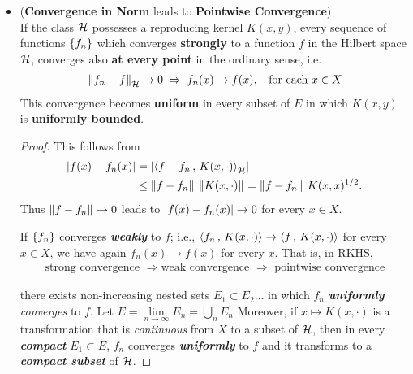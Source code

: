\documentclass[11pt]{article}
\begin{document}
\begin{itemize}
\item \begin{proposition} (\textbf{Convergence in Norm} leads to \textbf{Pointwise Convergence})\\
If the class ${\mathcal H}$ possesses a reproducing kernel $K(x, y)$, every sequence of functions $\left\{f_{n}\right\}$ which converges \textbf{strongly} to a function $f$ in the Hilbert space ${\mathcal H}$, converges also \textbf{at every point} in the ordinary sense, i.e. 
\begin{align*}
\left\|f_n - f\right\|_{{\mathcal H}} \rightarrow 0\; \Rightarrow \; f_{n}(x) \rightarrow f(x), \;\;\text{  for each }x \in X
\end{align*}
This convergence becomes \textbf{uniform} in every subset of $E$ in which $K(x, y)$ is \textbf{uniformly bounded}.
\end{proposition}
\begin{proof}
This follows from 
\begin{align}
\left\lvert f(x) - f_{n}(x) \right\rvert &= \left\lvert \left\langle f - f_{n}\,,\, K(x, \cdot)  \right\rangle_{{\mathcal H}} \right\rvert  \nonumber\\
&\le \left\|f - f_{n}\right\|_{}\,\left\|K(x, \cdot)\right\|_{}= \left\|f - f_{n}\right\|_{}\,K(x, x)^{1/2}. \label{eqn: CS_Kernel}
\end{align}  Thus $\left\|f - f_{n}\right\|_{} \rightarrow 0$ leads to $\left\lvert f(x) - f_{n}(x) \right\rvert \rightarrow 0$ for every $x \in X$.


If $\left\{f_{n}\right\}$ converges \emph{\textbf{weakly}} to $f$; i.e., $\left\langle f_{n}\,,\, K(x, \cdot)  \right\rangle \rightarrow \left\langle f\,,\, K(x, \cdot) \right\rangle $ for every $x \in X$, we have again $f_{n}(x) \rightarrow f(x)$ for every $x$.  That is, in RKHS, 
\begin{align*}
\text{strong convergence }\Rightarrow \text{weak convergence }\Rightarrow \text{ pointwise convergence}
\end{align*}

there exists non-increasing nested sets $E_{1}\subset E_{2}\ldots$  in which $f_{n}$ \emph{\textbf{uniformly} converges} to $f$. Let $E = \lim\limits_{n\rightarrow \infty}E_n = \bigcup_{n}E_n$ Moreover, if $x \mapsto K(x, \cdot)$ is a transformation that is \emph{continuous} from $X$ to a subset of ${\mathcal H}$, then in every \emph{\textbf{compact}} $E_{1}\subset E$, $f_{n}$ converges \emph{\textbf{uniformly}} to $f$ and it transforms to a \emph{\textbf{compact subset}} of ${\mathcal H}$. 


\end{proof}
\end{itemize}
\end{document}
